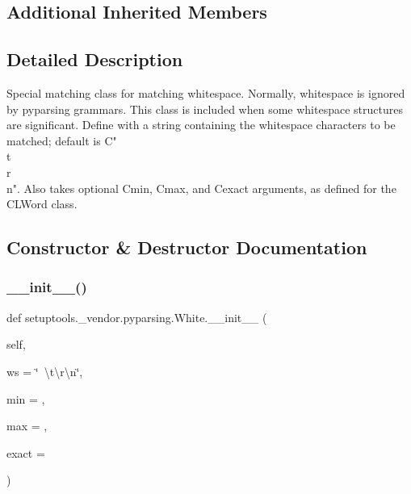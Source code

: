 \subsection*{Additional Inherited Members}


\subsection{Detailed Description}
\begin{DoxyVerb}Special matching class for matching whitespace.  Normally, whitespace is ignored
by pyparsing grammars.  This class is included when some whitespace structures
are significant.  Define with a string containing the whitespace characters to be
matched; default is C{" \\t\\r\\n"}.  Also takes optional C{min}, C{max}, and C{exact} arguments,
as defined for the C{L{Word}} class.
\end{DoxyVerb}
 

\subsection{Constructor \& Destructor Documentation}
\mbox{\label{classsetuptools_1_1__vendor_1_1pyparsing_1_1White_ab4c953a9e93bac4a6e1808fd34aa3957}} 
\subsubsection{\texorpdfstring{\+\_\+\+\_\+init\+\_\+\+\_\+()}{\_\_init\_\_()}}
{\footnotesize\ttfamily def setuptools.\+\_\+vendor.\+pyparsing.\+White.\+\_\+\+\_\+init\+\_\+\+\_\+ (\begin{DoxyParamCaption}\item[{}]{self,  }\item[{}]{ws = {\ttfamily \char`\"{}~\textbackslash{}t\textbackslash{}r\textbackslash{}n\char`\"{}},  }\item[{}]{min = {},  }\item[{}]{max = {},  }\item[{}]{exact = {} }\end{DoxyParamCaption})}




